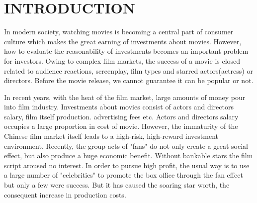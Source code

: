 \section{INTRODUCTION}
\par In modern society, watching movies is becoming a central part of consumer culture which makes the great earning of investments about movies. However, how to evaluate the reasonability of investments becomes an important problem for investors. Owing to complex film markets,  the success of a movie is closed related to audience reactions, screenplay, film types and starred actors(actress) or directors.  Before the movie release, we cannot guarantee it can be popular or not.
\par In recent years, with the heat of the film market, large amounts of money pour into film industry. Investments about movies consist of actors and directors salary,  film itself production. advertising fees etc. Actors and directors salary occupies a large proportion in cost of movie. However, the immaturity of the Chinese film market itself leads to a high-risk, high-reward investment environment.  Recently, the group acts of "fans" do not only create a great social effect, but also produce a huge economic benefit. Without bankable stars the film script aroused no interest. In order to pursue high profit, the usual way is to use a large number of "celebrities" to promote the box office through the fan effect but only a few were success. But it has caused the soaring star worth, the consequent increase in production costs. 

